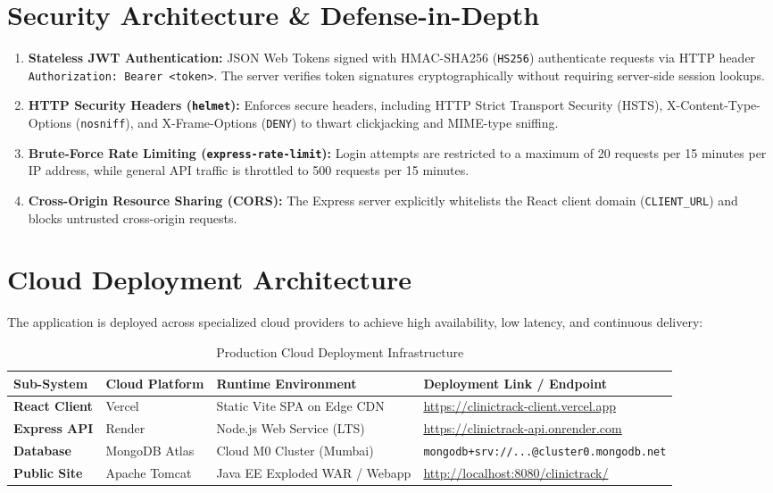 \documentclass[12pt,a4paper,oneside]{report}
\begin{document}
\section{Security Architecture \& Defense-in-Depth}
\begin{enumerate}
    \item \textbf{Stateless JWT Authentication:} JSON Web Tokens signed with HMAC-SHA256 (\texttt{HS256}) authenticate requests via HTTP header \texttt{Authorization: Bearer <token>}. The server verifies token signatures cryptographically without requiring server-side session lookups.
    \item \textbf{HTTP Security Headers (\texttt{helmet}):} Enforces secure headers, including HTTP Strict Transport Security (HSTS), X-Content-Type-Options (\texttt{nosniff}), and X-Frame-Options (\texttt{DENY}) to thwart clickjacking and MIME-type sniffing.
    \item \textbf{Brute-Force Rate Limiting (\texttt{express-rate-limit}):} Login attempts are restricted to a maximum of 20 requests per 15 minutes per IP address, while general API traffic is throttled to 500 requests per 15 minutes.
    \item \textbf{Cross-Origin Resource Sharing (CORS):} The Express server explicitly whitelists the React client domain (\texttt{CLIENT\_URL}) and blocks untrusted cross-origin requests.
\end{enumerate}

\section{Cloud Deployment Architecture}
The application is deployed across specialized cloud providers to achieve high availability, low latency, and continuous delivery:

\begin{table}[h!]
\centering
\caption{Production Cloud Deployment Infrastructure}
\label{tab:deployment_matrix}
\begin{tabularx}{\textwidth}{l l l X}
\toprule
\textbf{Sub-System} & \textbf{Cloud Platform} & \textbf{Runtime Environment} & \textbf{Deployment Link / Endpoint} \\
\midrule
\textbf{React Client} & Vercel & Static Vite SPA on Edge CDN & \url{https://clinictrack-client.vercel.app} \\
\textbf{Express API}  & Render & Node.js Web Service (LTS) & \url{https://clinictrack-api.onrender.com} \\
\textbf{Database}     & MongoDB Atlas & Cloud M0 Cluster (Mumbai) & \texttt{mongodb+srv://...@cluster0.mongodb.net} \\
\textbf{Public Site}  & Apache Tomcat & Java EE Exploded WAR / Webapp & \url{http://localhost:8080/clinictrack/} \\
\bottomrule
\end{tabularx}
\end{table}
\end{document}
